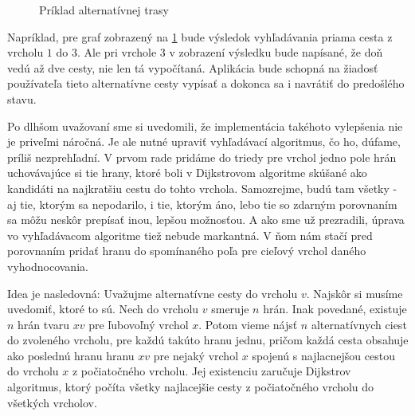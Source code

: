 \begin{figure}[H]
  \caption{Príklad alternatívnej trasy}
  \label{alternativ_priklad}
\end{figure}

Napríklad, pre graf zobrazený na \ref{alternativ_priklad} bude výsledok vyhľadávania priama cesta z vrcholu $1$ do $3$. Ale pri vrchole $3$ v zobrazení výsledku bude napísané, že doň vedú až dve cesty, nie len tá vypočítaná. Aplikácia bude schopná na žiadosť používateľa tieto alternatívne cesty vypísať a dokonca sa i navrátiť do predošlého stavu.\newline

Po dlhšom uvažovaní sme si uvedomili, že implementácia takéhoto vylepšenia nie je priveľmi náročná. Je ale nutné upraviť vyhľadávací algoritmus, čo ho, dúfame, príliš nezprehľadní. V prvom rade pridáme do triedy pre vrchol jedno pole hrán uchovávajúce si tie hrany, ktoré boli v Dijkstrovom algoritme skúšané ako kandidáti na najkratšiu cestu do tohto vrchola. Samozrejme, budú tam všetky - aj tie, ktorým sa nepodarilo, i tie, ktorým áno, lebo tie so zdarným porovnaním sa môžu neskôr prepísať inou, lepšou možnosťou. A ako sme už prezradili, úprava vo vyhľadávacom algoritme tiež nebude markantná. V ňom nám stačí pred porovnaním pridať hranu do spomínaného poľa pre cieľový vrchol daného vyhodnocovania.\newline

Idea je nasledovná: Uvažujme alternatívne cesty do vrcholu $v$. Najskôr si musíme uvedomiť, ktoré to sú. Nech do vrcholu $v$ smeruje $n$ hrán. Inak povedané, existuje $n$ hrán tvaru $xv$ pre ľubovoľný vrchol $x$. Potom vieme nájsť $n$ alternatívnych ciest do zvoleného vrcholu, pre každú takúto hranu jednu, pričom každá cesta obsahuje ako poslednú hranu hranu $xv$ pre nejaký vrchol $x$ spojenú s najlacnejšou cestou do vrcholu $x$ z počiatočného vrcholu. Jej existenciu zaručuje Dijkstrov algoritmus, ktorý počíta všetky najlacejšie cesty z počiatočného vrcholu do všetkých vrcholov.\newline


